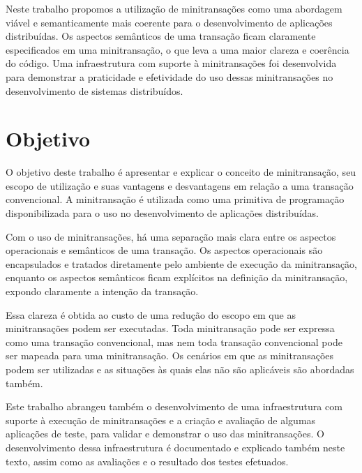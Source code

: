 \documentclass[11pt,twoside,a4paper]{book}
\begin{document}
Neste trabalho propomos a utilização de minitransações como uma abordagem viável e semanticamente mais coerente para o desenvolvimento de aplicações distribuídas. Os aspectos semânticos de uma transação ficam claramente especificados em uma minitransação, o que leva a uma maior clareza e coerência do código. Uma infraestrutura com suporte à minitransações foi desenvolvida para demonstrar a praticidade e efetividade do uso dessas minitransações no desenvolvimento de sistemas distribuídos.

\section{Objetivo}
\label{sec:objetivo}
O objetivo deste trabalho é apresentar e explicar o conceito de minitransação, seu escopo de utilização e suas vantagens e desvantagens em relação a uma transação convencional. A minitransação é utilizada como uma primitiva de programação disponibilizada para o uso no desenvolvimento de aplicações distribuídas. 

Com o uso de minitransações, há uma separação mais clara entre os aspectos operacionais e semânticos de uma transação. Os aspectos operacionais são encapsulados e tratados diretamente pelo ambiente de execução da minitransação, enquanto os aspectos semânticos ficam explícitos na definição da minitransação, expondo claramente a intenção da transação.

Essa clareza é obtida ao custo de uma redução do escopo em que as minitransações podem ser executadas. Toda minitransação pode ser expressa como uma transação convencional, mas nem toda transação convencional pode ser mapeada para uma minitransação. Os cenários em que as minitransações podem ser utilizadas e as situações às quais elas não são aplicáveis são abordadas também.

Este trabalho abrangeu também o desenvolvimento de uma infraestrutura com suporte à execução de minitransações e a criação e avaliação de algumas aplicações de teste, para validar e demonstrar o uso das minitransações. O desenvolvimento dessa infraestrutura é documentado e explicado também neste texto, assim como as avaliações e o resultado dos testes efetuados.


\end{document}
